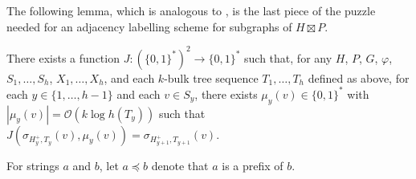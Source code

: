 \documentclass[kpfonts]{patmorin}
\newcommand{\Oh}{\mathcal{O}}
\let\preceq\preccurlyeq
\begin{document}
The following lemma, which is analogous to , is the last piece of the puzzle needed for an adjacency labelling scheme for subgraphs of $H\boxtimes P$. 

\begin{lem}
  There exists a function $J:(\{0,1\}^*)^2\to \{0,1\}^*$ such that, 
  for any $H$, $P$, $G$, $\varphi$, $S_1,\ldots,S_h$, $X_1,\ldots,X_h$, and each $k$-bulk tree sequence $T_1,\ldots,T_h$ defined as above, for each $y\in\{1,\ldots,h-1\}$ and each $v\in S_y$, there exists $\mu_y(v)\in\{0,1\}^*$ with $|\mu_y(v)|= \Oh(k\log h(T_y))$ such that $J(\sigma_{H^+_y,T_y}(v), \mu_y(v))=\sigma_{H^+_{y+1},T_{y+1}}(v)$.
\end{lem}

For strings $a$ and $b$, let $a\preceq b$ denote that $a$ is a prefix of $b$.
\end{document}
